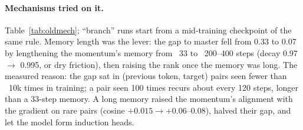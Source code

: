 \documentclass[10pt,twocolumn]{article}
\begin{document}
\begin{table}[t]
\centering
\caption{The previous rule, building up (110M, 300M tokens, training-time; master 2.7513, master + extras 2.732, full
precision 2.683). Each row adds to the one above unless marked.}
\label{tab:oldrule}
\end{table}

\paragraph{Mechanisms tried on it.} Table~\ref{tab:oldmech}; ``branch'' runs start from a mid-training checkpoint of the
same rule. Memory length was the lever: the gap to master fell from 0.33 to 0.07 by lengthening the momentum's memory
from ~33 to ~200--400 steps (decay 0.97 $\to$ 0.995, or dry friction), then raising the rank once the memory was long.
The measured reason: the gap sat in (previous token, target) pairs seen fewer than ~10k times in training; a pair seen
100 times recurs about every 120 steps, longer than a 33-step memory. A long memory raised the momentum's alignment with
the gradient on rare pairs (cosine $+0.015\to+0.06$--$0.08$), halved their gap, and let the model form induction heads.
\end{document}
